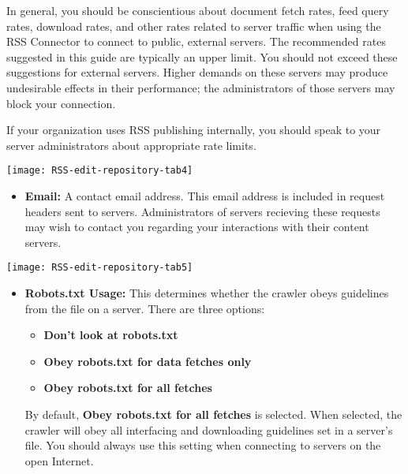 In general, you should be conscientious about document fetch rates,
feed query rates, download rates, and other rates related to server
traffic when using the RSS Connector to connect to public, external
servers. The recommended rates suggested in this guide are typically
an upper limit. You should not exceed these suggestions for external
servers. Higher demands on these servers may produce undesirable
effects in their performance; the administrators of those servers may
block your connection.

If your organization uses RSS publishing internally, you should speak
to your server administrators about appropriate rate limits.

\texttt{[image: RSS-edit-repository-tab4]}

\begin{itemize}

\item \textbf{Email:} A contact email address. This email address is included in request headers sent to servers. Administrators of servers recieving these requests may wish to contact you regarding your interactions with their content servers.

\end{itemize}

\texttt{[image: RSS-edit-repository-tab5]}

\begin{itemize}

\item \textbf{Robots.txt Usage:} This determines whether the crawler obeys guidelines from the  file on a server. There are three options:

\begin{itemize}

\item \textbf{Don't look at robots.txt}

\item \textbf{Obey robots.txt for data fetches only}

\item \textbf{Obey robots.txt for all fetches}

\end{itemize}

By default, \textbf{Obey robots.txt for all fetches} is selected. When
selected, the crawler will obey all interfacing and downloading
guidelines set in a server's  file. You should
always use this setting when connecting to servers on the open Internet.

\end{itemize}

